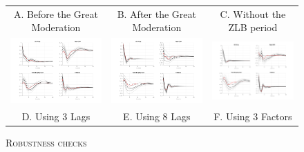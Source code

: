 \documentclass[11pt,a4paper]{article}
\begin{document}
\begin{landscape}
	\begin{figure}[H]
		\begin{center}
			\caption{\textsc{Robustness checks}}
			\label{fig:robustness}
			\begin{tabular}{ccc}
				A. Before the Great Moderation & B. After the Great Moderation & C. Without the ZLB period \\
				\includegraphics[width=7.5cm]{Figures/Robustness_beforeGM} &  \includegraphics[width=7.5cm]{Figures/Robustness_afterGM}&
				\includegraphics[width=7.5cm]{Figures/Robustness_ZLB} \\
				D. Using 3 Lags  & E. Using 8 Lags & F. Using 3 Factors  \\

\end{tabular}
\end{center}
\end{figure}
\end{landscape}
\end{document}
